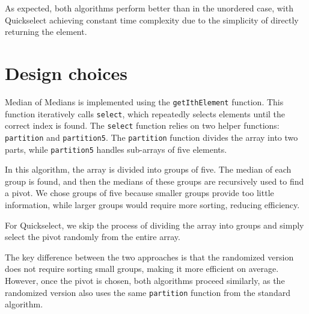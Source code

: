 \documentclass[paper=a4, fontsize=11pt]{scrartcl}
\numberwithin{equation}{section}
\numberwithin{figure}{section}
\numberwithin{table}{section}
\begin{document}
    As expected, both algorithms perform better than in the unordered case, with Quickselect achieving constant time complexity due to the simplicity of directly returning the element.

    \section{Design choices}
    Median of Medians is implemented using the \texttt{getIthElement} function. 
    This function iteratively calls \texttt{select}, which repeatedly selects elements until the correct index is found.
    The \texttt{select} function relies on two helper functions: \texttt{partition} and \texttt{partition5}.
    The \texttt{partition} function divides the array into two parts, while \texttt{partition5} handles sub-arrays of five elements.

    In this algorithm, the array is divided into groups of five. 
    The median of each group is found, and then the medians of these groups are recursively used to find a pivot. 
    We chose groups of five because smaller groups provide too little information, while larger groups would require more sorting, reducing efficiency.

    For Quickselect, we skip the process of dividing the array into groups and simply select the pivot randomly from the entire array.

    The key difference between the two approaches is that the randomized version does not require sorting small groups, making it more efficient on average.
    However, once the pivot is chosen, both algorithms proceed similarly, as the randomized version also uses the same \texttt{partition} function from the standard algorithm.
\end{document}

